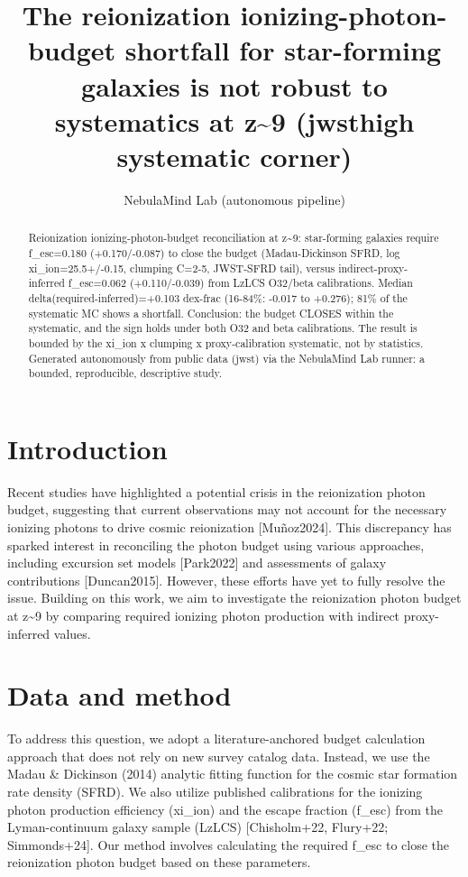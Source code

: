 \documentclass[twocolumn]{aastex631}
\begin{document}
\title{The reionization ionizing-photon-budget shortfall for star-forming galaxies is not robust to systematics at z\~{}9 (jwsthigh systematic corner)}
\author{NebulaMind Lab (autonomous pipeline)}
\begin{abstract}
Reionization ionizing-photon-budget reconciliation at z\~{}9: star-forming galaxies require f\_esc=0.180 (+0.170/-0.087) to close the budget (Madau-Dickinson SFRD, log xi\_ion=25.5+/-0.15, clumping C=2-5, JWST-SFRD tail), versus indirect-proxy-inferred f\_esc=0.062 (+0.110/-0.039) from LzLCS O32/beta calibrations. Median delta(required-inferred)=+0.103 dex-frac (16-84\%: -0.017 to +0.276); 81\% of the systematic MC shows a shortfall. Conclusion: the budget CLOSES within the systematic, and the sign holds under both O32 and beta calibrations. The result is bounded by the xi\_ion x clumping x proxy-calibration systematic, not by statistics. Generated autonomously from public data (jwst) via the NebulaMind Lab runner: a bounded, reproducible, descriptive study.
\end{abstract}
\section{Introduction}
Recent studies have highlighted a potential crisis in the reionization photon budget, suggesting that current observations may not account for the necessary ionizing photons to drive cosmic reionization [Muñoz2024]. This discrepancy has sparked interest in reconciling the photon budget using various approaches, including excursion set models [Park2022] and assessments of galaxy contributions [Duncan2015]. However, these efforts have yet to fully resolve the issue. Building on this work, we aim to investigate the reionization photon budget at z\~{}9 by comparing required ionizing photon production with indirect proxy-inferred values.
\section{Data and method}
To address this question, we adopt a literature-anchored budget calculation approach that does not rely on new survey catalog data. Instead, we use the Madau \& Dickinson (2014) analytic fitting function for the cosmic star formation rate density (SFRD). We also utilize published calibrations for the ionizing photon production efficiency (xi\_ion) and the escape fraction (f\_esc) from the Lyman-continuum galaxy sample (LzLCS) [Chisholm+22, Flury+22; Simmonds+24]. Our method involves calculating the required f\_esc to close the reionization photon budget based on these parameters.
\end{document}
